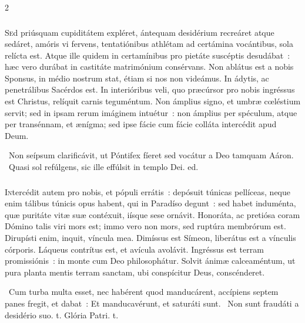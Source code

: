 \documentclass[9pt,twoside]{extarticle}
\begin{document}
\begin{multicols}{2}
{\subsubsection*{\center {}}
\lettrine{S}ed priúsquam cupiditátem expléret, ántequam desidérium recreáret atque sedáret, amóris vi fervens, tentatiónibus athlétam ad certámina vocántibus, sola relícta est. Atque ille quidem in certamínibus pro pietáte suscéptis desudábat~: hæc vero durábat in castitáte matrimónium consérvans. Non ablátus est a nobis Sponsus, in médio nostrum stat, étiam si nos non videámus. In ádytis, ac penetrálibus Sacérdos est. In interióribus veli, quo præcúrsor pro nobis ingréssus est Christus, relíquit carnis teguméntum. Non ámplius signo, et umbræ cœléstium servit; sed in ipsam rerum imáginem intuétur~: non ámplius per spéculum, atque per transénnam, et ænígma; sed ipse fácie cum fácie colláta intercédit apud Deum. 

\begin{tightlist}{}
\item {}~Non seípsum clarificávit, ut Póntifex fíeret \textred{*} sed vocátur a Deo tamquam Aáron. ~Quasi sol refúlgens, sic ille effúlsit in templo Dei. ed.
\end{tightlist}

\subsubsection*{\center {}}
\lettrine{I}ntercédit autem pro nobis, et pópuli errátis~: depósuit túnicas pellíceas, neque enim tálibus túnicis opus habent, qui in Paradíso degunt~: sed habet induménta, quæ puritáte vitæ suæ contéxuit, iísque sese ornávit. Honoráta, ac pretiósa coram Dómino talis viri mors est; immo vero non mors, sed ruptúra membrórum est. Dirupísti enim, inquit, víncula mea. Dimíssus est Símeon, liberátus est a vínculis córporis. Láqueus contrítus est, et avícula avolávit. Ingréssus est terram promissiónis~: in monte cum Deo philosophátur. Solvit ánimæ calceaméntum, ut pura planta mentis terram sanctam, ubi conspícitur Deus, conscénderet.

\begin{tightlist}{}
\item {}~Cum turba multa esset, nec habérent quod manducárent, accípiens septem panes fregit, et dabat~: \textred{*} Et manducavérunt, et saturáti sunt. ~Non sunt fraudáti a desidério suo. t. Glória Patri. t.
\end{tightlist}

}
\end{multicols}
\end{document}
